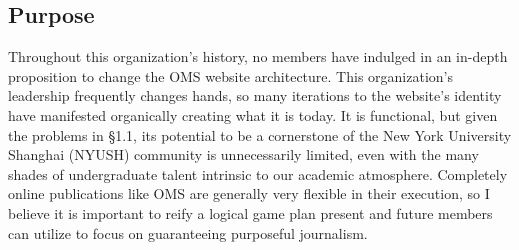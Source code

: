 \subsection{Purpose}
Throughout this organization's history, no members have indulged in an in-depth proposition to change the OMS website architecture. This organization's leadership frequently changes hands, so many iterations to the website's identity have manifested organically creating what it is today. It is functional, but given the problems in §1.1, its potential to be a cornerstone of the New York University Shanghai (NYUSH) community is unnecessarily limited, even with the many shades of undergraduate talent intrinsic to our academic atmosphere. Completely online publications like OMS are generally very flexible in their execution, so I believe it is important to reify a logical game plan present and future members can utilize to focus on guaranteeing purposeful journalism.
